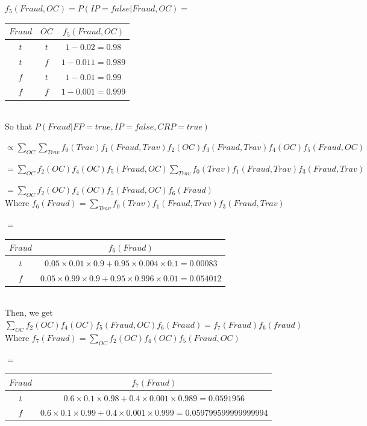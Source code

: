 \documentclass[10pt]{article}
\begin{document}
\begin{enumerate}
	$f_5(Fraud, OC) = P(IP = false | Fraud, OC) = $
	\begin{tabular}{|c|c|c|}
	\hline
 	  $Fraud$ & $OC$ & $f_5(Fraud, OC)$ \\
	\hline
	  $t$ & $t$ & $1 - 0.02 = 0.98$  \\
	\hline
	 $t$ & $f$ & $1 - 0.011 = 0.989$  \\
	\hline
	  $f$ & $t$ & $1 - 0.01 = 0.99$ \\
	\hline
	$f$ & $f$ & $1 - 0.001 = 0.999$  \\
	\hline
	\end{tabular}\\
	
	So that $P(Fraud | FP = true, IP = false, CRP = true)$
	
	$\propto \sum_{OC} \sum_{Trav} f_0(Trav) f_1(Fraud, Trav) f_2(OC) f_3(Fraud, Trav) f_4(OC) f_5(Fraud, OC)$
	
	$= \sum_{OC} f_2(OC) f_4(OC) f_5(Fraud, OC) \sum_{Trav} f_0(Trav) f_1(Fraud, Trav) f_3(Fraud, Trav)$
	
	$= \sum_{OC} f_2(OC) f_4(OC) f_5(Fraud, OC) f_6(Fraud)$\\
	
	Where $f_6(Fraud) = \sum_{Trav} f_0(Trav) f_1(Fraud, Trav) f_3(Fraud, Trav)$
	
	$=$
	\begin{tabular}{|c|c|}
	\hline
 	  $Fraud$ & $f_6(Fraud)$ \\
	\hline
	  $t$ & $0.05 \times 0.01 \times 0.9 + 0.95 \times 0.004 \times 0.1 = 0.00083$  \\
	\hline
	  $f$ & $0.05 \times 0.99 \times 0.9 + 0.95 \times 0.996 \times 0.01 = 0.054012 $ \\
	\hline
	\end{tabular}\\
	
	Then, we get $\sum_{OC} f_2(OC) f_4(OC) f_5(Fraud, OC) f_6(Fraud) = f_7(Fraud) f_6(fraud)$\\
	
	Where $f_7(Fraud) = \sum_{OC} f_2(OC) f_4(OC) f_5(Fraud, OC)$
	
	$=$
	\begin{tabular}{|c|c|}
	\hline
 	  $Fraud$ & $f_7(Fraud)$ \\
	\hline
	  $t$ & $0.6 \times 0.1 \times 0.98 + 0.4 \times 0.001 \times 0.989 = 0.0591956$  \\
	\hline
	  $f$ & $0.6 \times 0.1 \times 0.99 + 0.4 \times 0.001 \times 0.999 = 0.059799599999999994$ \\
	\hline
	\end{tabular}\\


\end{enumerate}
\end{document}
